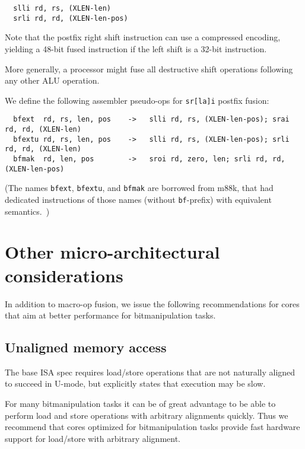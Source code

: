 \begin{minipage}{\linewidth}
\begin{verbatim}
  slli rd, rs, (XLEN-len)
  srli rd, rd, (XLEN-len-pos)
\end{verbatim}
\end{minipage}

Note that the postfix right shift instruction can use a compressed encoding,
yielding a 48-bit fused instruction if the left shift is a 32-bit instruction.

More generally, a processor might fuse all destructive shift operations following
any other ALU operation.

We define the following assembler pseudo-ops for {\tt sr[la]i} postfix fusion:

\begin{minipage}{\linewidth}
\begin{verbatim}
  bfext  rd, rs, len, pos    ->   slli rd, rs, (XLEN-len-pos); srai rd, rd, (XLEN-len)
  bfextu rd, rs, len, pos    ->   slli rd, rs, (XLEN-len-pos); srli rd, rd, (XLEN-len)
  bfmak  rd, len, pos        ->   sroi rd, zero, len; srli rd, rd, (XLEN-len-pos)
\end{verbatim}
\end{minipage}

(The names {\tt bfext}, {\tt bfextu}, and {\tt bfmak} are borrowed from m88k,
that had dedicated instructions of those names (without {\tt bf}-prefix) with
equivalent semantics.~\cite[p.~3-28]{m88k})


\section{Other micro-architectural considerations}

In addition to macro-op fusion, we issue the following recommendations for
cores that aim at better performance for bitmanipulation tasks.

\subsection{Unaligned memory access}

The base ISA spec requires load/store operations that are not naturally aligned
to succeed in U-mode, but explicitly states that execution may be slow.

For many bitmanipulation tasks it can be of great advantage to be able to
perform load and store operations with arbitrary alignments quickly. Thus we
recommend that cores optimized for bitmanipulation tasks provide fast hardware
support for load/store with arbitrary alignment.

